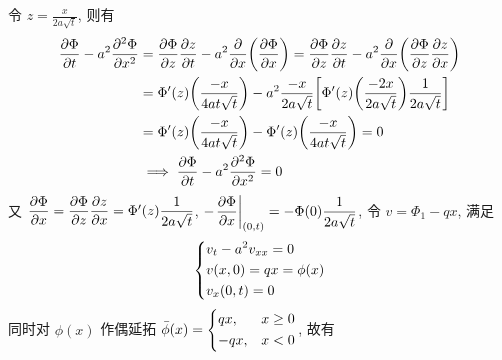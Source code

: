 \begin{solution}
令 $z = \frac{x}{2a\sqrt{t}}$, 则有
\begin{align*}
{\frac{\partial {\Phi}}{\partial {t}}} - a^2 {\frac{\partial {^2\Phi}}{\partial {x^2}}}
&= {\frac{\partial {\Phi}}{\partial {z}}} {\frac{\partial {z}}{\partial {t}}}
 - a^2 {{\frac{\partial {}}{\partial {x}}}}{\left( {{\frac{\partial {\Phi}}{\partial {x}}}} \right)}
= {\frac{\partial {\Phi}}{\partial {z}}} {\frac{\partial {z}}{\partial {t}}}
 - a^2 {{\frac{\partial {}}{\partial {x}}}}{\left( {{\frac{\partial {\Phi}}{\partial {z}}}{\frac{\partial {z}}{\partial {x}}}} \right)} \\
&= \Phi'(z) {\left( {\frac{-x}{4at\sqrt{t}}} \right)}
 - a^2 \frac{-x}{2a\sqrt{t}} {\left[ {
  \Phi'(z) {\left( {\frac{-2x}{2a\sqrt{t}}} \right)} \frac1{2a\sqrt{t}}
 } \right]} \\
&= \Phi'(z) {\left( {\frac{-x}{4at\sqrt{t}}} \right)}
 - \Phi'(z) {\left( {\frac{-x}{4at\sqrt{t}}} \right)} = 0\\
&\implies {\frac{\partial {\Phi}}{\partial {t}}} - a^2 {\frac{\partial {^2\Phi}}{\partial {x^2}}} = 0
\end{align*}
又 ${\dfrac{\partial {\Phi}}{\partial {x}}} = {\dfrac{\partial {\Phi}}{\partial {z}}}{\dfrac{\partial {z}}{\partial {x}}}
= \Phi'(z)\dfrac{1}{2a\sqrt{t}}$,
$-{\left.{{\dfrac{\partial {\Phi}}{\partial {x}}}} \right|}_{(0, t)}=-\Phi(0)\dfrac{1}{2a\sqrt{t}}$,
令 $v = \Phi_1 - qx$, 满足
\[ \begin{dcases}
v_t - a^2 v_{xx} = 0 \\
v(x, 0) = qx = \phi(x) \\
v_x(0, t) = 0
\end{dcases} \]
同时对 $\phi(x)$ 作偶延拓
$\bar{\phi}(x) = \begin{dcases}qx,&x\geq0\\-qx,&x<0\end{dcases}$, 故有


\end{solution}
